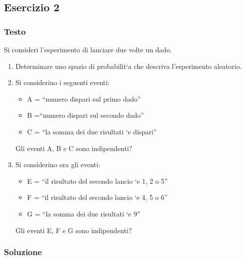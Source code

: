 \subsection{Esercizio 2}
\subsubsection{Testo}

Si consideri l’esperimento di lanciare due volte un dado.
\begin{enumerate}[label=(\alph*)]
\item Determinare uno spazio di probabilit‘a che descriva l’esperimento aleatorio.
  \item Si considerino i seguenti eventi:
\begin{itemize}
\item A = “numero dispari sul primo dado”
\item B =“numero dispari sul secondo dado”
\item C = “la somma dei due risultati ‘e dispari”
\end{itemize}
Gli eventi A, B e C sono indipendenti?
\item Si considerino ora gli eventi:
  \begin{itemize}
  \item E = “il risultato del secondo lancio ‘e 1, 2 o 5”
    \item F = “il risultato del secondo lancio ‘e 4, 5 o 6”
    \item G = “la somma dei due risultati ‘e 9”
  \end{itemize}
  Gli eventi E, F e G sono indipendenti?
\end{enumerate}

\subsubsection{Soluzione}

